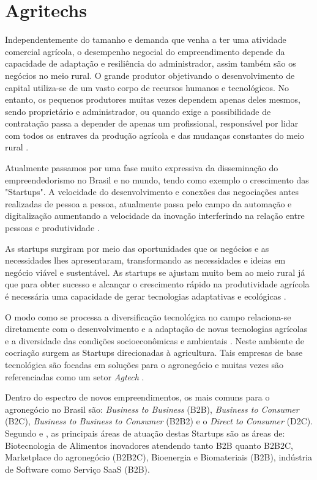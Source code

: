 \section{Agritechs}


Independentemente do tamanho e demanda que venha a ter uma atividade comercial agrícola, o desempenho negocial do empreendimento depende da capacidade de adaptação e resiliência do administrador, assim também são os negócios no meio rural. O grande produtor objetivando o desenvolvimento de capital utiliza-se de um vasto corpo de recursos humanos e tecnológicos. No entanto, os pequenos produtores muitas vezes dependem apenas deles mesmos, sendo proprietário e administrador, ou quando exige a possibilidade de contratação passa a depender de apenas um profissional, responsável por lidar com todos os entraves da produção agrícola e das mudanças constantes do meio rural \cite{soares_relacao_2017}. 

Atualmente passamos por uma fase muito expressiva da disseminação do empreendedorismo no Brasil e no mundo, tendo como exemplo o crescimento das "Startups". A velocidade do desenvolvimento e conexões das negociações antes realizadas de pessoa a pessoa, atualmente passa pelo campo da automação e digitalização aumentando a velocidade da inovação interferindo na relação entre pessoas e produtividade  \cite{campos_o_2016}. 

As startups surgiram por meio das oportunidades que os negócios e as necessidades lhes apresentaram, transformando as necessidades e ideias em negócio viável e sustentável. As startups se ajustam muito bem ao meio rural já que para obter sucesso e alcançar o crescimento rápido na produtividade agrícola é necessária uma capacidade de gerar tecnologias adaptativas e ecológicas \cite{contini_hayami_2019}.

O modo como se processa a diversificação tecnológica no campo relaciona-se diretamente com o desenvolvimento e a adaptação de novas tecnologias agrícolas e a diversidade das condições socioeconômicas e ambientais \cite{fen-azmeyer_o_2019}. Neste ambiente de cocriação surgem as Startups direcionadas à agricultura. Tais empresas de base tecnológica são focadas em soluções para o agronegócio e muitas vezes são referenciadas como um setor \textit{Agtech} \cite{blanco_agtechs:_2019}.

Dentro do espectro de novos empreendimentos, os mais comuns para o agronegócio no Brasil são: \textit{Business to Business} (B2B), \textit{Business to Consumer} (B2C), \textit{Business to Business to Consumer} (B2B2) e o \textit{Direct to Consumer} (D2C). Segundo  e \cite{abstartups_startupbase_2019}, as principais  áreas de atuação destas Startups são as áreas de: Biotecnologia de Alimentos inovadores atendendo tanto B2B quanto B2B2C, Marketplace do agronegócio (B2B2C), Bioenergia e Biomateriais (B2B), indústria de Software como Serviço SaaS (B2B).


